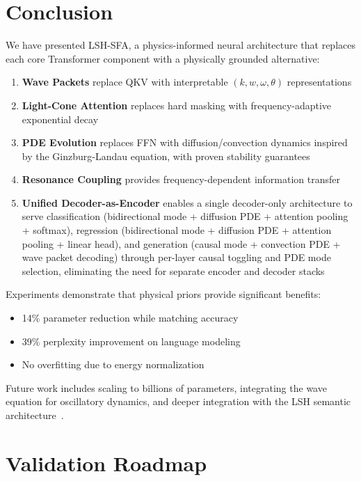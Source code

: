 \documentclass{article}
\begin{document}
\section{Conclusion}

We have presented LSH-SFA, a physics-informed neural architecture that replaces each core Transformer component with a physically grounded alternative:

\begin{enumerate}
\item \textbf{Wave Packets} replace QKV with interpretable $(k, w, \omega, \theta)$ representations
\item \textbf{Light-Cone Attention} replaces hard masking with frequency-adaptive exponential decay
\item \textbf{PDE Evolution} replaces FFN with diffusion/convection dynamics inspired by the Ginzburg-Landau equation, with proven stability guarantees
\item \textbf{Resonance Coupling} provides frequency-dependent information transfer
\item \textbf{Unified Decoder-as-Encoder} enables a single decoder-only architecture to serve classification (bidirectional mode + diffusion PDE + attention pooling + softmax), regression (bidirectional mode + diffusion PDE + attention pooling + linear head), and generation (causal mode + convection PDE + wave packet decoding) through per-layer causal toggling and PDE mode selection, eliminating the need for separate encoder and decoder stacks
\end{enumerate}

Experiments demonstrate that physical priors provide significant benefits:
\begin{itemize}
\item 14\% parameter reduction while matching accuracy
\item 39\% perplexity improvement on language modeling
\item No overfitting due to energy normalization
\end{itemize}

Future work includes scaling to billions of parameters, integrating the wave equation for oscillatory dynamics, and deeper integration with the LSH semantic architecture~\cite{lsh-three-layer}.

\section{Validation Roadmap}
\end{document}
